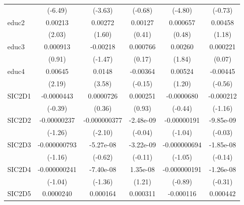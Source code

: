 \begin{table}[htbp]
\begin{tabular}{l*{5}{c}}
            &     (-6.49)         &     (-3.63)         &     (-0.68)         &     (-4.80)         &     (-0.73)         \\
educ2       &     0.00213\sym{*}  &     0.00272         &     0.00127         &    0.000657         &     0.00458         \\
            &      (2.03)         &      (1.60)         &      (0.41)         &      (0.48)         &      (1.18)         \\
educ3       &    0.000913         &    -0.00218         &    0.000766         &     0.00260         &    0.000221         \\
            &      (0.91)         &     (-1.47)         &      (0.17)         &      (1.84)         &      (0.07)         \\
educ4       &     0.00645\sym{*}  &      0.0148\sym{***}&    -0.00364         &     0.00524         &    -0.00445         \\
            &      (2.19)         &      (3.58)         &     (-0.15)         &      (1.20)         &     (-0.56)         \\
SIC2D1      &  -0.0000443         &   0.0000726         &    0.000251         &  -0.0000680         &   -0.000212         \\
            &     (-0.39)         &      (0.36)         &      (0.93)         &     (-0.44)         &     (-1.16)         \\
SIC2D2      & -0.00000237         &-0.000000377\sym{*}  &   -2.48e-09         & -0.00000191         &   -9.85e-09         \\
            &     (-1.26)         &     (-2.10)         &     (-0.04)         &     (-1.04)         &     (-0.03)         \\
SIC2D3      &-0.000000793         &   -5.27e-08         &   -3.22e-09         &-0.000000694         &   -1.85e-08         \\
            &     (-1.16)         &     (-0.62)         &     (-0.11)         &     (-1.05)         &     (-0.14)         \\
SIC2D4      &-0.000000241         &   -7.40e-08         &    1.35e-08         &-0.000000191         &   -1.26e-08         \\
            &     (-1.04)         &     (-1.36)         &      (1.21)         &     (-0.89)         &     (-0.31)         \\
SIC2D5      &   0.0000240         &    0.000164         &    0.000311         &   -0.000116         &    0.000442         \\

\end{tabular}
\end{table}
